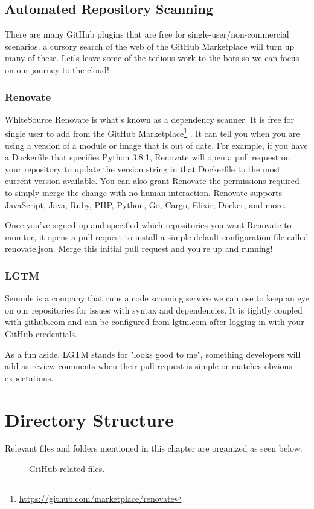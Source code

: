 \subsection{Automated Repository Scanning}

\justify
There are many GitHub plugins that are free for
single-user/non-commercial scenarios. a cursory search of the web of the
GitHub Marketplace will turn up many of these. Let's leave some of the
tedious work to the bots so we can focus on our journey to the cloud!


\subsubsection{Renovate}

WhiteSource Renovate is what's known as a dependency scanner. It is free
for single user to add from the GitHub Marketplace\footnote{\url{https://github.com/marketplace/renovate}}
. It can tell you when you are using a version of a module or image that
is out of date. For example, if you have a Dockerfile that specifies
Python 3.8.1, Renovate will open a pull request on your repository to
update the version string in that Dockerfile to the most current version
available. You can also grant Renovate the permissions required to
simply merge the change with no human interaction. Renovate supports
JavaScript, Java, Ruby, PHP, Python, Go, Cargo, Elixir, Docker, and
more.

\justify
Once you've signed up and specified which repositories you want Renovate
to monitor, it opens a pull request to install a simple default
configuration file called renovate.json. Merge this initial pull request
and you're up and running!

\subsubsection{LGTM}

Semmle is a company that runs a code scanning service we can use to keep
an eye on our repositories for issues with syntax and dependencies. It
is tightly coupled with github.com and can be configured from lgtm.com
after logging in with your GitHub credentials.

\justify
As a fun aside, LGTM stands for "looks good to me", something developers
will add as review comments when their pull request is simple or matches
obvious expectations.

\clearpage


\section{Directory Structure}

Relevant files and folders mentioned in this chapter are organized as
seen below.

\begin{figure}[!htb]
   \centering
   
   \caption{GitHub related files.}
\end{figure}
